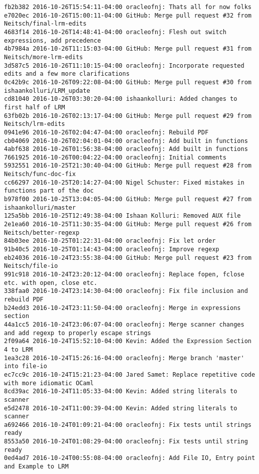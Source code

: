 \begin{lstlisting}
fb2b382 2016-10-26T15:54:11-04:00 oracleofnj: Thats all for now folks
e7020ec 2016-10-26T15:00:11-04:00 GitHub: Merge pull request #32 from Neitsch/final-lrm-edits
4683f14 2016-10-26T14:48:41-04:00 oracleofnj: Flesh out switch expressions, add precedence
4b7984a 2016-10-26T11:15:03-04:00 GitHub: Merge pull request #31 from Neitsch/more-lrm-edits
3d587c5 2016-10-26T11:10:15-04:00 oracleofnj: Incorporate requested edits and a few more clarifications
0c42b9c 2016-10-26T09:22:08-04:00 GitHub: Merge pull request #30 from ishaankolluri/LRM_update
cd81040 2016-10-26T03:30:20-04:00 ishaankolluri: Added changes to first half of LRM
63fb02b 2016-10-26T02:13:17-04:00 GitHub: Merge pull request #29 from Neitsch/lrm-edits
0941e96 2016-10-26T02:04:47-04:00 oracleofnj: Rebuild PDF
cb04069 2016-10-26T02:04:01-04:00 oracleofnj: Add built in functions
4abf638 2016-10-26T01:56:38-04:00 oracleofnj: Add built in functions
7661925 2016-10-26T00:04:22-04:00 oracleofnj: Initial comments
5932551 2016-10-25T21:30:40-04:00 GitHub: Merge pull request #28 from Neitsch/func-doc-fix
cc66297 2016-10-25T20:14:27-04:00 Nigel Schuster: Fixed mistakes in functions part of the doc
b978f00 2016-10-25T13:04:05-04:00 GitHub: Merge pull request #27 from ishaankolluri/master
125a5bb 2016-10-25T12:49:38-04:00 Ishaan Kolluri: Removed AUX file
2e1ea60 2016-10-25T11:30:35-04:00 GitHub: Merge pull request #26 from Neitsch/better-regexp
84b03ee 2016-10-25T01:22:31-04:00 oracleofnj: Fix let order
91b40c5 2016-10-25T01:14:43-04:00 oracleofnj: Improve regexp
eb24036 2016-10-24T23:55:38-04:00 GitHub: Merge pull request #23 from Neitsch/file-io
991c918 2016-10-24T23:20:12-04:00 oracleofnj: Replace fopen, fclose etc. with open, close etc.
338faa0 2016-10-24T23:14:30-04:00 oracleofnj: Fix file inclusion and rebuild PDF
b24edd3 2016-10-24T23:11:50-04:00 oracleofnj: Merge in expressions section
44a1cc5 2016-10-24T23:06:07-04:00 oracleofnj: Merge scanner changes and add regexp to properly escape strings
2f09a64 2016-10-24T15:52:10-04:00 Kevin: Added the Expression Section 4 to LRM
1ea3c28 2016-10-24T15:26:16-04:00 oracleofnj: Merge branch 'master' into file-io
ec7cc9c 2016-10-24T15:21:23-04:00 Jared Samet: Replace repetitive code with more idiomatic OCaml
8cd39ac 2016-10-24T11:05:33-04:00 Kevin: Added string literals to scanner
e5d2478 2016-10-24T11:00:39-04:00 Kevin: Added string literals to scanner
a692466 2016-10-24T01:09:21-04:00 oracleofnj: Fix tests until strings ready
8553a50 2016-10-24T01:08:29-04:00 oracleofnj: Fix tests until string ready
0ed4ad7 2016-10-24T00:55:08-04:00 oracleofnj: Add File IO, Entry point and Example to LRM

\end{lstlisting}
